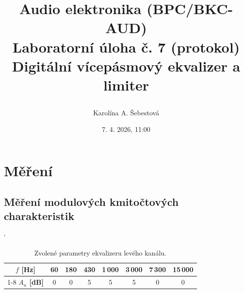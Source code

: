\documentclass[a4paper, czech]{article}
\title{
	\begin{framed}
		\setstretch{1.5}
		{\large Audio elektronika (BPC/BKC-AUD)}\\
		Laboratorní úloha č. 7 (protokol)\\
		\textbf{Digitální vícepásmový ekvalizer a limiter}
	\end{framed}
	}
\author{Karolína A. Šebestová}
\date{7. 4. 2026, 11:00}
\begin{document}
\maketitle

\section{Měření}

\subsection{Měření modulových kmitočtových charakteristik}

\begin{table}[H]
    \centering
    \catcode`
    \caption{Zvolené parametry ekvalizeru levého kanálu.}

    \begin{tabular}{cccccccc}
        \toprule
        \textbf{$f$ [Hz]} & 60 & 180 & 430 & 1\,000 & 3\,000 & 7\,300 & 15\,000 \\
        \cmidrule(rl){1-8}
        \textbf{$A_u$ [dB]} & 0 & 0 & 5 & 5 & 5 & 0 & 0 \\
        \bottomrule
    \end{tabular}
\end{table}
\end{document}
